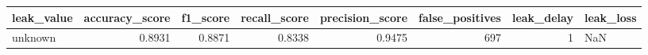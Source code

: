 \begin{tabular}{lrrrrrrl}
\toprule
leak\_value & accuracy\_score & f1\_score & recall\_score & precision\_score & false\_positives & leak\_delay & leak\_loss \\
\midrule
unknown & 0.8931 & 0.8871 & 0.8338 & 0.9475 & 697 & 1 & NaN \\
\bottomrule
\end{tabular}
